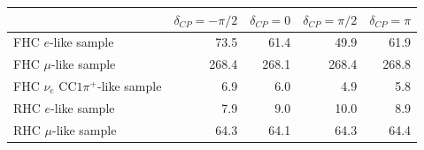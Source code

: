 \documentclass[11pt]{elsarticle}
\begin{document}
\begin{table}[H]
	\center
	\begin{tabular} { | l ||r | r | r | r | }
		\hline
		&	$\delta_{CP}=-\pi/2$	&	$\delta_{CP}=0$	&	$\delta_{CP}=\pi/2$	&	$\delta_{CP}=\pi$	\\ \hline\hline
		FHC $e$-like sample				& 73.5  & 61.4  & 49.9  & 61.9  \\ \hline
		FHC $\mu$-like sample			& 268.4 & 268.1 & 268.4 & 268.8 \\ \hline
		FHC $\nu_e$ CC$1\pi^{+}$-like sample	& 6.9   & 6.0   & 4.9   & 5.8   \\ \hline
		RHC $e$-like sample				& 7.9   & 9.0   & 10.0  & 8.9   \\ \hline
		RHC $\mu$-like sample			& 64.3  & 64.1  & 64.3  & 64.4  \\ \hline	
	\end{tabular}
\end{table}
\end{document}
